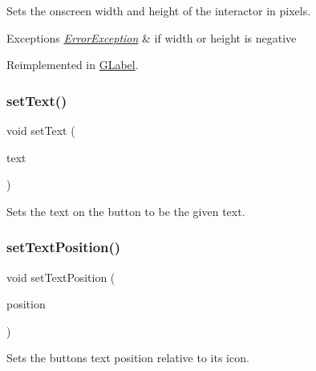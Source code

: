 Sets the onscreen width and height of the interactor in pixels. 


\begin{DoxyExceptions}{Exceptions}
{\em \mbox{\hyperlink{classErrorException}{Error\+Exception}}} & if width or height is negative \\
\hline
\end{DoxyExceptions}


Reimplemented in \mbox{\hyperlink{classGLabel_a0fe8cce1a80750f36fa14ee99ca34014}{G\+Label}}.

\mbox{\label{classGButton_ac1ae51949d41ee9054634be5967d91b8}} 
\subsubsection{\texorpdfstring{set\+Text()}{setText()}}
{\footnotesize\ttfamily void set\+Text (\begin{DoxyParamCaption}\item[{const std\+::string \&}]{text }\end{DoxyParamCaption})\hspace{0.3cm}{\ttfamily [virtual]}}



Sets the text on the button to be the given text. 

\mbox{\label{classGButton_af822b8d73c652f7c59d875d7cdfc5302}} 
\subsubsection{\texorpdfstring{set\+Text\+Position()}{setTextPosition()}}
{\footnotesize\ttfamily void set\+Text\+Position (\begin{DoxyParamCaption}\item[{\mbox{\hyperlink{classGInteractor_a8e0d441725a81d2bbdebbea09078260e}{G\+Interactor\+::\+Text\+Position}}}]{position }\end{DoxyParamCaption})\hspace{0.3cm}{\ttfamily [virtual]}}



Sets the button\textquotesingle{}s text position relative to its icon. 

